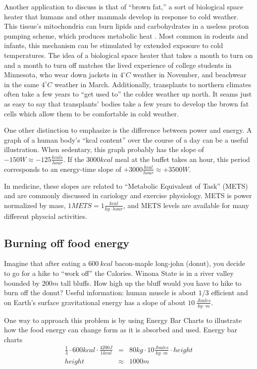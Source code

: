 \documentclass[12pt]{iopart}
\newcommand{\bea}{\begin{eqnarray}}
\newcommand{\eea}{\end{eqnarray}}
\newcommand{\degC}{^{\circ}C}
\begin{document}
Another application to discuss is that of ``brown fat,'' a sort of biological space heater that humans and other mammals develop in response to cold weather.  This tissue's mitochondria can burn lipids and carbohydrates in a useless proton pumping scheme, which produces metabolic heat \cite{brown_fat}.  Most common in rodents and infants, this mechanism can be stimulated by extended exposure to cold temperatures.  The idea of a biological space heater that takes a month to turn on and a month to turn off matches the lived experience of college students in Minnesota, who wear down jackets in $4\degC$ weather in November, and beachwear in the same $4\degC$ weather in March.  Additionally, transplants to northern climates often take a few years to ``get used to'' the colder weather up north. It seams just as easy to say that transplants' bodies take a few years to develop the brown fat cells which allow them to be comfortable in cold weather.

One other distinction to emphasize is the difference between power and energy.  A graph of a human body's ``kcal content'' over the course of a day can be a useful illustration.  When sedentary, this graph probably has the slope of $-150W\approx -125 \frac{kcals}{hour}$.  If the $3000kcal$ meal at the buffet takes an hour, this period corresponds to an energy-time slope of $+3000\frac{kcal}{hour}\approx +3500W$.  

In medicine, these slopes are related to ``Metabolic Equivalent of Task'' (METS) and are commonly discussed in cariology and exercise physiology.  METS is power normalized by mass, $1METS=1\frac{kcal}{kg\cdot hour}$, and METS levels are available for many different physcial activities. \cite{METS}

\subsection{Burning off food energy}
Imagine that after eating a $600~kcal$ bacon-maple long-john (donut), you decide to go for a hike to ``work off'' the Calories.  Winona State  is in a river valley bounded by $200m$ tall bluffs.  How high up the bluff would you have to hike to burn off the donut?  
Useful information: human muscle is about $1/3$ efficient and on Earth's surface gravitational energy has a slope of about $10~\frac{Joules}{kg\cdot m}$.

One way to approach this problem is by using Energy Bar Charts \cite{energy_bar_charts} to illustrate how the food energy can change form as it is absorbed and used.    
Energy bar charts
\bea
\frac{1}{3}\cdot600kcal\cdot\frac{4200J}{1kcal} 
	&=& 80kg\cdot10\frac{Joules}{kg\cdot m}\cdot height\\
height &\approx&  1000 m
\eea
\end{document}
